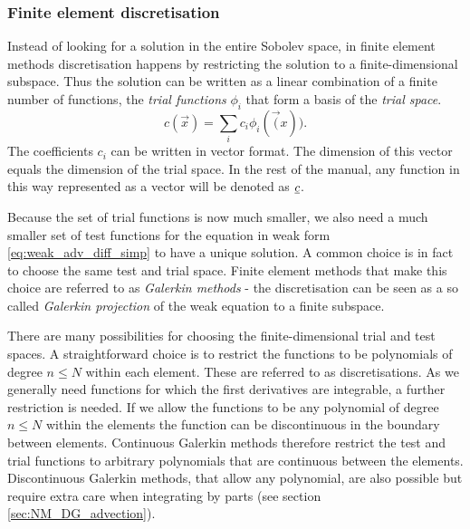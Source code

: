 \subsubsection{Finite element discretisation}
Instead of looking for a solution in the entire Sobolev space,
in finite element methods discretisation
happens by restricting the solution to a 
finite-dimensional subspace. Thus the solution can be 
written as a linear combination of a finite number of functions,
the \emph{trial functions} $\phi_i$ that form a basis of the 
\emph{trial space}.
\begin{equation*}
  c(\vec{x})=\sum_i c_i \phi_i(\vec(x)).
\end{equation*}
The coefficients $c_i$ can be written in vector format. The 
dimension of this vector equals the dimension of the trial 
space. In the rest of the manual, any function in 
this way represented as a vector will be denoted as $\underline{c}$.

Because the set of trial functions is now much smaller, we also need
a much smaller set of test functions for the equation in weak 
form \eqref{eq:weak_adv_diff_simp} to have a unique 
solution. A common choice is in fact to choose the same
test and trial space. Finite element methods that make this choice are 
referred to as \emph{Galerkin methods} - the discretisation 
can be seen as a so called \emph{Galerkin 
projection} of the weak equation to a finite subspace.

There are many possibilities for choosing the finite-dimensional trial and test spaces. 
A straightforward choice is to restrict the functions to be polynomials of degree 
$n\leq N$ within each element. These are referred to as \PN discretisations. 
As we generally need functions for which the first 
derivatives are integrable, a further restriction 
is needed. If we allow the functions to be any polynomial of 
degree $n\leq N$ within the elements the function can be 
discontinuous in the boundary between elements. 
Continuous Galerkin methods therefore
restrict the test and trial functions to arbitrary polynomials 
that are continuous between the elements. Discontinuous Galerkin methods, 
that allow any polynomial, are also possible but require 
extra care when integrating by parts (see section \ref{sec:NM_DG_advection}).


